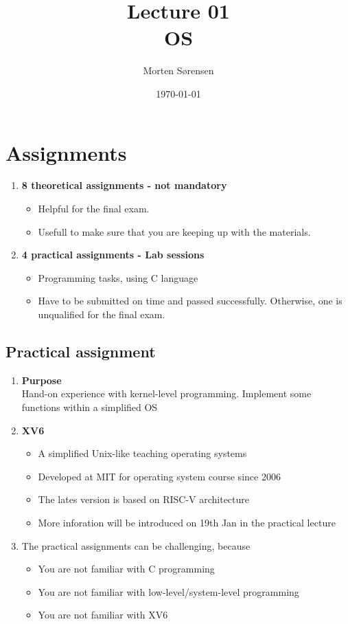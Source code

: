 \documentclass{article}
\title{\huge{Lecture 01\\ OS}}
\author{Morten Sørensen}
\date{\today}
\begin{document}
\maketitle

\section{Assignments}
\begin{enumerate}
    \item{
        \textbf{8 theoretical assignments - not mandatory}
        \begin{itemize}
            \item Helpful for the final exam.
            \item Usefull to make sure that you are keeping up with the materials.
        \end{itemize}
    }
    \item{
        \textbf{4 practical assignments - Lab sessions}
        \begin{itemize}
            \item Programming tasks, using C language
            \item Have to be submitted on time and passed successfully. Otherwise, one is unqualified for the final exam.
        \end{itemize}
    }
\end{enumerate}

\subsection{Practical assignment}
\begin{enumerate}
    \item {
        \textbf{Purpose} \\
        Hand-on experience with kernel-level programming. Implement some functions within a simplified OS
    }
    \item{
        \textbf{XV6}
        \begin{itemize}
            \item A simplified Unix-like teaching operating systems
            \item Developed at MIT for operating system course since 2006
            \item The lates version is based on RISC-V architecture
            \item More inforation will be introduced on 19th Jan in the practical lecture
        \end{itemize}
    }
    \item {
        The practical assignments can be challenging, because
        \begin{itemize}
            \color{red!45!white}
            \item You are not familiar with C programming
            \item You are not familiar with low-level/system-level programming
            \item You are not familiar with XV6
        \end{itemize}
    }
\end{enumerate}
\end{document}

